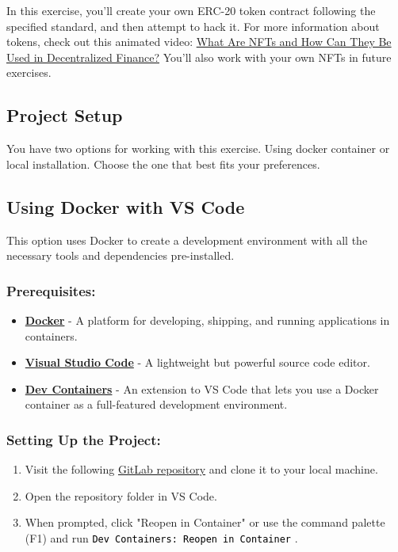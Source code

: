 \documentclass[12pt]{article}
\newcommand{\codegrey}[1]{%
  \texttt{\colorbox{black!4}{\textcolor{black}{#1}}}%
}
\begin{document}
In this exercise, you'll create your own ERC-20 token contract following the specified standard, and then attempt to hack it. For more information about tokens, check out this animated video: \href{https://www.youtube.com/watch?v=Xdkkux6OxfM}{What Are NFTs and How Can They Be Used in Decentralized Finance?} You'll also work with your own NFTs in future exercises.

\subsection*{Project Setup}

You have two options for working with this exercise. Using docker container or local installation. Choose the one that best fits your preferences.

\subsection{Using Docker with VS Code}

This option uses Docker to create a development environment with all the necessary tools and dependencies pre-installed.

\subsubsection*{Prerequisites:}

\begin{itemize}
    \item \textbf{\href{https://www.docker.com/products/docker-desktop}{Docker}} - A platform for developing, shipping, and running applications in containers.
    \item \textbf{\href{https://code.visualstudio.com/}{Visual Studio Code}} - A lightweight but powerful source code editor.
    \item \textbf{\href{https://marketplace.visualstudio.com/items?itemName=ms-vscode-remote.remote-containers}{Dev Containers}} - An extension to VS Code that lets you use a Docker container as a full-featured development environment.
\end{itemize}

\subsubsection*{Setting Up the Project:}

\begin{enumerate}
  \item Visit the following \href{https://gitlab.fel.cvut.cz/radovluk/smart-contracts-exercises/-/tree/main/03-ERC20-CTUToken/task/task-code?ref_type=heads}{GitLab repository} and clone it to your local machine.
  \item Open the repository folder in VS Code.
  \item When prompted, click "Reopen in Container" or use the command palette (F1) and run \codegrey{Dev Containers: Reopen in Container}.
\end{enumerate}
\end{document}
